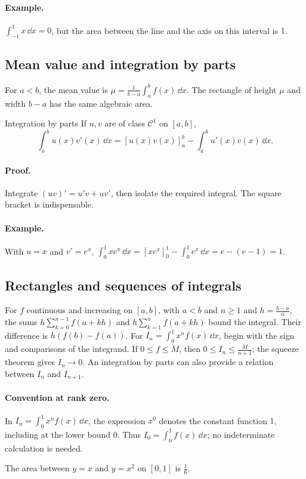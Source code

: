 \paragraph{Example.} $\int_{-1}^{1}x\,\dd x=0$, but the area between the line and the axis on this interval is $1$.
\subsection{Mean value and integration by parts}
For $a<b$, the mean value is $\mu=\frac1{b-a}\int_a^b f(x)\,\dd x$. The rectangle of height $\mu$ and width $b-a$ has the same algebraic area.
\begin{retenir}{Integration by parts}
If $u,v$ are of class $\mathcal C^1$ on $[a,b]$,
\[\int_a^b u(x)v'(x)\,\dd x=[u(x)v(x)]_a^b-\int_a^b u'(x)v(x)\,\dd x.\]
\end{retenir}
\paragraph{Proof.} Integrate $(uv)'=u'v+uv'$, then isolate the required integral. The square bracket is indispensable.
\paragraph{Example.} With $u=x$ and $v'=e^x$, $\int_0^1xe^x\,\dd x=[xe^x]_0^1-\int_0^1e^x\,\dd x=e-(e-1)=1$.
\subsection{Rectangles and sequences of integrals}
For $f$ continuous and increasing on $[a,b]$, with $a<b$ and $n\ge1$ and $h=\frac{b-a}{n}$, the sums $h\sum_{k=0}^{n-1}f(a+kh)$ and $h\sum_{k=1}^{n}f(a+kh)$ bound the integral. Their difference is $h(f(b)-f(a))$.
For $I_n=\int_0^1x^nf(x)\,\dd x$, begin with the sign and comparisons of the integrand. If $0\le f\le M$, then $0\le I_n\le \frac{M}{n+1}$; the squeeze theorem gives $I_n\to0$. An integration by parts can also provide a relation between $I_n$ and $I_{n+1}$.
\paragraph{Convention at rank zero.} In $I_n=\int_0^1x^nf(x)\,\dd x$, the expression $x^0$ denotes the constant function $1$, including at the lower bound $0$. Thus $I_0=\int_0^1f(x)\,\dd x$; no indeterminate calculation is needed.


\begin{center}\par\small The area between $y=x$ and $y=x^2$ on $[0,1]$ is $\frac{1}{6}$.\end{center}

